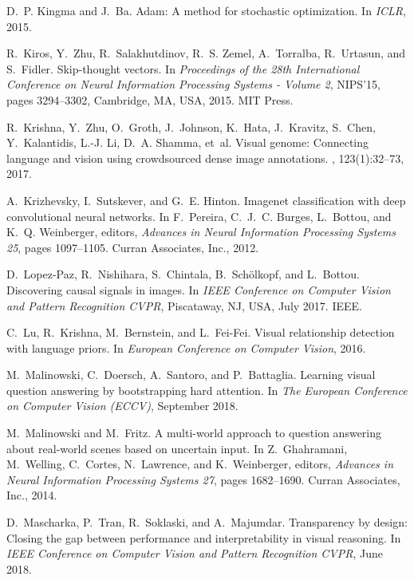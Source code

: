 \documentclass[10pt,twocolumn,letterpaper]{article}
\begin{document}
\begin{thebibliography}{10}
D.~P. Kingma and J.~Ba.
\newblock Adam: {A} method for stochastic optimization.
\newblock In {\em ICLR}, 2015.

R.~Kiros, Y.~Zhu, R.~Salakhutdinov, R.~S. Zemel, A.~Torralba, R.~Urtasun, and
  S.~Fidler.
\newblock Skip-thought vectors.
\newblock In {\em Proceedings of the 28th International Conference on Neural
  Information Processing Systems - Volume 2}, NIPS'15, pages 3294--3302,
  Cambridge, MA, USA, 2015. MIT Press.

R.~Krishna, Y.~Zhu, O.~Groth, J.~Johnson, K.~Hata, J.~Kravitz, S.~Chen,
  Y.~Kalantidis, L.-J. Li, D.~A. Shamma, et~al.
\newblock Visual genome: Connecting language and vision using crowdsourced
  dense image annotations.
, 123(1):32--73, 2017.

A.~Krizhevsky, I.~Sutskever, and G.~E. Hinton.
\newblock Imagenet classification with deep convolutional neural networks.
\newblock In F.~Pereira, C.~J.~C. Burges, L.~Bottou, and K.~Q. Weinberger,
  editors, {\em Advances in Neural Information Processing Systems 25}, pages
  1097--1105. Curran Associates, Inc., 2012.

D.~Lopez-Paz, R.~Nishihara, S.~Chintala, B.~Sch{\"o}lkopf, and L.~Bottou.
\newblock Discovering causal signals in images.
\newblock In {\em {IEEE} Conference on Computer Vision and Pattern Recognition
  {CVPR}}, Piscataway, NJ, USA, July 2017. IEEE.

C.~Lu, R.~Krishna, M.~Bernstein, and L.~Fei-Fei.
\newblock Visual relationship detection with language priors.
\newblock In {\em European Conference on Computer Vision}, 2016.

M.~Malinowski, C.~Doersch, A.~Santoro, and P.~Battaglia.
\newblock Learning visual question answering by bootstrapping hard attention.
\newblock In {\em The European Conference on Computer Vision (ECCV)}, September
  2018.

M.~Malinowski and M.~Fritz.
\newblock A multi-world approach to question answering about real-world scenes
  based on uncertain input.
\newblock In Z.~Ghahramani, M.~Welling, C.~Cortes, N.~Lawrence, and
  K.~Weinberger, editors, {\em Advances in Neural Information Processing
  Systems 27}, pages 1682--1690. Curran Associates, Inc., 2014.

D.~Mascharka, P.~Tran, R.~Soklaski, and A.~Majumdar.
\newblock Transparency by design: Closing the gap between performance and
  interpretability in visual reasoning.
\newblock In {\em {IEEE} Conference on Computer Vision and Pattern Recognition
  {CVPR}}, June 2018.


\end{thebibliography}
\end{document}
